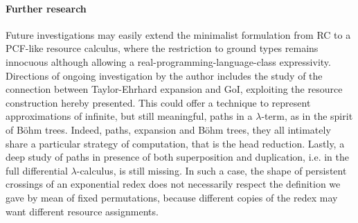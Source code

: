 \paragraph{Further research} 
Future investigations may easily extend the minimalist formulation from RC to 
a PCF-like resource calculus, where the restriction to ground types remains 
innocuous although allowing a real-programming-language-class expressivity.
Directions of ongoing investigation by the author includes 
the study of the connection between Taylor-Ehrhard expansion and GoI, 
exploiting the resource construction hereby presented.
This could offer a technique to represent approximations of 
infinite, but still meaningful, paths in a $\lambda$-term,
as in the spirit of B\"{o}hm trees.
Indeed, paths, expansion and B\"{o}hm trees, they all intimately share a 
particular strategy of computation, that is the head reduction.
Lastly, a deep study of paths in presence of both superposition 
and duplication, i.e. in the full differential $\lambda$-calculus,
is still missing.
In such a case, the shape of persistent crossings of an exponential redex 
does not necessarily respect the definition we gave by mean of fixed 
permutations, because different copies of the redex may want different 
resource assignments.